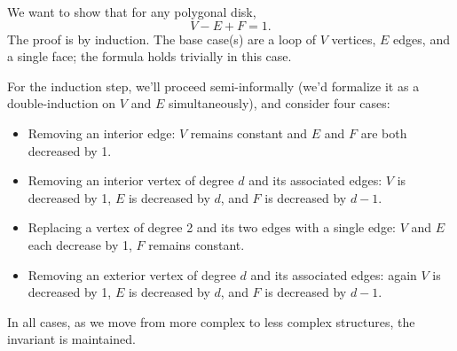 \documentclass[11pt]{article}
\newenvironment{exercise}[2][Exercise]{\begin{trivlist}
\item[\hskip \labelsep {\bfseries #1}\hskip \labelsep {\bfseries #2}]}{\end{trivlist}}
\begin{document}
\maketitle

\begin{exercise}{2.1, Euler's Polyhedral Formula.} We want to show that for any polygonal disk,
  $$V - E + F = 1.$$
  The proof is by induction. The base case(s) are a loop of $V$ vertices, $E$ edges, and a single face; the formula holds trivially in this case.

  For the induction step, we'll proceed semi-informally (we'd formalize it as a double-induction on $V$ and $E$ simultaneously), and consider four cases:
  \begin{itemize}
  \item{Removing an interior edge: $V$ remains constant and $E$ and $F$ are both decreased by 1.}
  \item{Removing an interior vertex of degree $d$ and its associated edges: $V$ is decreased by 1, $E$ is decreased by $d$, and $F$ is decreased by $d-1$.}
  \item{Replacing a vertex of degree 2 and its two edges with a single edge: $V$ and $E$ each decrease by 1, $F$ remains constant.}
  \item{Removing an exterior vertex of degree $d$ and its associated edges: again $V$ is decreased by 1, $E$ is decreased by $d$, and $F$ is decreased by $d-1$.}
  \end{itemize}

  In all cases, as we move from more complex to less complex structures, the invariant is maintained.
\end{exercise}
\end{document}
